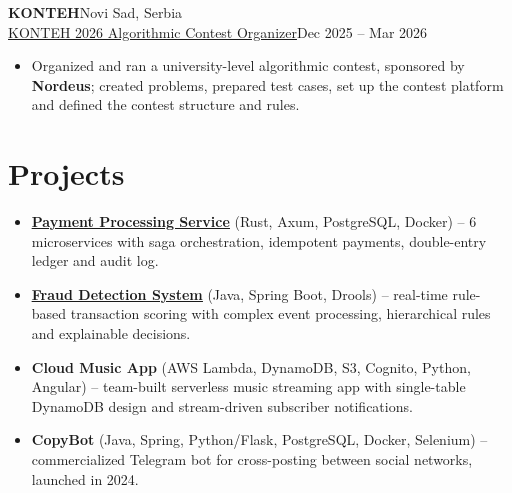 \documentclass[10pt,a4paper]{article}
\newcommand{\link}[2]{\href{#1}{\textcolor{linkblue}{\underline{#2}}}}
\newcommand{\job}[4]{%
  \textbf{#1}\hfill #2\\
  \underline{#3}\hfill #4\par}
\begin{document}
\vspace{3pt}
\job{KONTEH}{Novi Sad, Serbia}{KONTEH 2026 Algorithmic Contest Organizer}{Dec 2025 -- Mar 2026}
\begin{itemize}
  \item Organized and ran a university-level algorithmic contest, sponsored by \textbf{Nordeus}; created problems,
        prepared test cases, set up the contest platform and defined the contest structure and rules.
\end{itemize}

\section{Projects}
\begin{itemize}
  \item \link{https://github.com/maksimprivalov/payment-processing-service}{\textbf{Payment Processing Service}} (Rust, Axum, PostgreSQL, Docker) -- 6 microservices with saga orchestration,
        idempotent payments, double-entry ledger and audit log.
  \item \link{https://github.com/maksimprivalov/credit-card-fraud-detection}{\textbf{Fraud Detection System}} (Java, Spring Boot, Drools) -- real-time rule-based transaction scoring with
        complex event processing, hierarchical rules and explainable decisions.
  \item \textbf{Cloud Music App} (AWS Lambda, DynamoDB, S3, Cognito, Python, Angular) -- team-built serverless
        music streaming app with single-table DynamoDB design and stream-driven subscriber notifications.
  \item \textbf{CopyBot} (Java, Spring, Python/Flask, PostgreSQL, Docker, Selenium) -- commercialized Telegram bot for
        cross-posting between social networks, launched in 2024.
\end{itemize}

\end{document}
